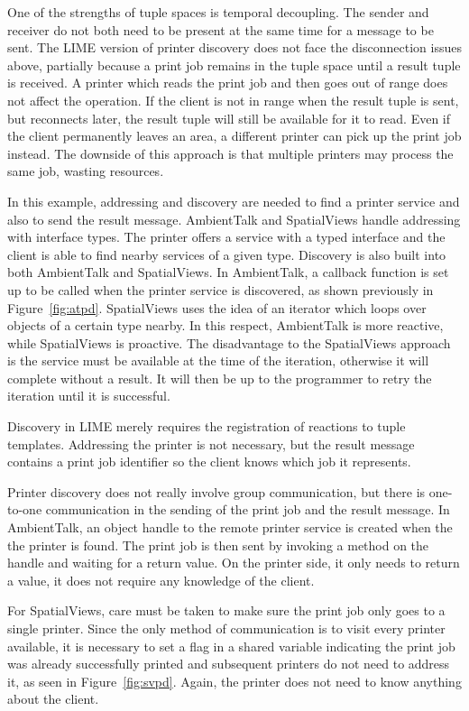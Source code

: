 One of the strengths of tuple spaces is temporal decoupling. The sender and receiver do not both need to be present at the same time for a message to be sent. The LIME version of printer discovery does not face the disconnection issues above, partially because a print job remains in the tuple space until a result tuple is received. A printer which reads the print job and then goes out of range does not affect the operation. If the client is not in range when the result tuple is sent, but reconnects later, the result tuple will still be available for it to read. Even if the client permanently leaves an area, a different printer can pick up the print job instead. The downside of this approach is that multiple printers may process the same job, wasting resources.


In this example, addressing and discovery are needed to find a printer service and also to send the result message. AmbientTalk and SpatialViews handle addressing with interface types. The printer offers a service with a typed interface and the client is able to find nearby services of a given type. Discovery is also built into both AmbientTalk and SpatialViews. In AmbientTalk, a callback function is set up to be called when the printer service is discovered, as shown previously in Figure~\ref{fig:atpd}. SpatialViews uses the idea of an iterator which loops over objects of a certain type nearby. In this respect, AmbientTalk is more reactive, while SpatialViews is proactive. The disadvantage to the SpatialViews approach is the service must be available at the time of the iteration, otherwise it will complete without a result. It will then be up to the programmer to retry the iteration until it is successful.

Discovery in LIME merely requires the registration of reactions to tuple templates. Addressing the printer is not necessary, but the result message contains a print job identifier so the client knows which job it represents.

Printer discovery does not really involve group communication, but there is one-to-one communication in the sending of the print job and the result message. In AmbientTalk, an object handle to the remote printer service is created when the the printer is found. The print job is then sent by invoking a method on the handle and waiting for a return value. On the printer side, it only needs to return a value, it does not require any knowledge of the client.

For SpatialViews, care must be taken to make sure the print job only goes to a single printer. Since the only method of communication is to visit every printer available, it is necessary to set a flag in a shared variable indicating the print job was already successfully printed and subsequent printers do not need to address it, as seen in Figure~\ref{fig:svpd}. Again, the printer does not need to know anything about the client.

